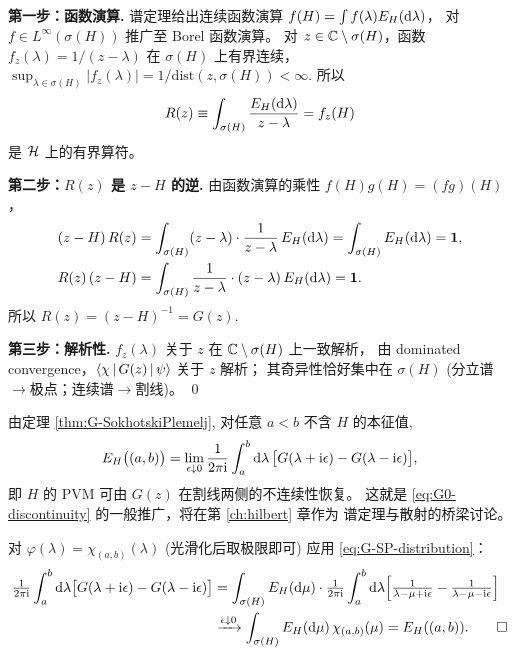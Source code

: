 \begin{proof*}
\textbf{第一步：函数演算.}
谱定理给出连续函数演算
$f(H)=\int f(\lambda)E_H(\mathrm{d}\lambda)$，
对 $f\in L^\infty(\sigma(H))$ 推广至 Borel 函数演算。
对 $z\in\mathbb{C}\setminus\sigma(H)$，函数
$f_z(\lambda)=1/(z-\lambda)$ 在 $\sigma(H)$ 上有界连续，
$\sup_{\lambda\in\sigma(H)}|f_z(\lambda)| = 1/\mathrm{dist}(z,\sigma(H))<\infty$.
所以
\begin{equation}
  R(z)\equiv\int_{\sigma(H)}\frac{E_H(\mathrm{d}\lambda)}{z-\lambda}
  = f_z(H)
\end{equation}
是 $\mathcal{H}$ 上的有界算符。

\textbf{第二步：$R(z)$ 是 $z-H$ 的逆.}
由函数演算的乘性 $f(H)g(H)=(fg)(H)$，
\begin{align}
  (z-H)\,R(z)
  &= \int_{\sigma(H)}(z-\lambda)\cdot\frac{1}{z-\lambda}\,E_H(\mathrm{d}\lambda)
   = \int_{\sigma(H)} E_H(\mathrm{d}\lambda) = \mathbf 1,\\
  R(z)\,(z-H)
  &= \int_{\sigma(H)}\frac{1}{z-\lambda}\cdot(z-\lambda)\,E_H(\mathrm{d}\lambda)
   = \mathbf 1.
\end{align}
所以 $R(z)=(z-H)^{-1}=G(z)$.

\textbf{第三步：解析性.}
$f_z(\lambda)$ 关于 $z$ 在 $\mathbb{C}\setminus\sigma(H)$ 上一致解析，
由 dominated convergence，$\left\langle \chi \,\middle|\, G(z) \,\middle|\, \psi \right\rangle$ 关于 $z$ 解析；
其奇异性恰好集中在 $\sigma(H)$ (分立谱$\to$极点；连续谱$\to$割线)。
\qed
\end{proof*}

\begin{corollary}\label{cor:G-stone}
由定理 \ref{thm:G-SokhotskiPlemelj}, 对任意 $a<b$ 不含 $H$ 的本征值,
\begin{equation}\label{eq:G-stone-formula}
  E_H\bigl((a,b)\bigr)
  = \lim_{\epsilon\downarrow 0}\frac{1}{2\pi\mathrm{i}}
    \int_a^b \mathrm{d}\lambda\,\bigl[G(\lambda+\mathrm{i}\epsilon)-G(\lambda-\mathrm{i}\epsilon)\bigr],
\end{equation}
即 $H$ 的 PVM 可由 $G(z)$ 在割线两侧的不连续性恢复。
这就是
\eqref{eq:G0-discontinuity} 的一般推广，将在第 \ref{ch:hilbert} 章作为
谱定理与散射的桥梁讨论。
\end{corollary}

\begin{proof*}
对 $\varphi(\lambda)=\chi_{(a,b)}(\lambda)$
(光滑化后取极限即可) 应用 \eqref{eq:G-SP-distribution}：
\begin{align}
  \tfrac{1}{2\pi\mathrm{i}}\int_a^b\mathrm{d}\lambda
  \bigl[G(\lambda+\mathrm{i}\epsilon)-G(\lambda-\mathrm{i}\epsilon)\bigr]
  &= \int_{\sigma(H)} E_H(\mathrm{d}\mu)
    \cdot\tfrac{1}{2\pi\mathrm{i}}\int_a^b\mathrm{d}\lambda
       \!\left[\tfrac{1}{\lambda-\mu+\mathrm{i}\epsilon}
              -\tfrac{1}{\lambda-\mu-\mathrm{i}\epsilon}\right]\notag\\
  &\xrightarrow{\epsilon\downarrow 0}
    \int_{\sigma(H)} E_H(\mathrm{d}\mu)\,\chi_{(a,b)}(\mu)
   = E_H((a,b)).\qed
\end{align}
\end{proof*}

